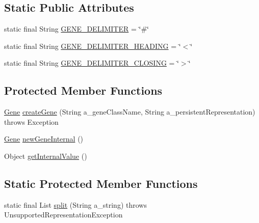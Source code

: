 \subsection*{Static Public Attributes}
\begin{DoxyCompactItemize}
\item 
static final String \hyperlink{classorg_1_1jgap_1_1impl_1_1_composite_gene_ad2e0364fa1181ae5b7334a545864f96b}{G\-E\-N\-E\-\_\-\-D\-E\-L\-I\-M\-I\-T\-E\-R} = \char`\"{}\#\char`\"{}
\item 
static final String \hyperlink{classorg_1_1jgap_1_1impl_1_1_composite_gene_aedd0a6ff682d116a12aabf06b110922a}{G\-E\-N\-E\-\_\-\-D\-E\-L\-I\-M\-I\-T\-E\-R\-\_\-\-H\-E\-A\-D\-I\-N\-G} = \char`\"{}$<$\char`\"{}
\item 
static final String \hyperlink{classorg_1_1jgap_1_1impl_1_1_composite_gene_ab95ce27b4f68e0d22791bb4d82d6c0d5}{G\-E\-N\-E\-\_\-\-D\-E\-L\-I\-M\-I\-T\-E\-R\-\_\-\-C\-L\-O\-S\-I\-N\-G} = \char`\"{}$>$\char`\"{}
\end{DoxyCompactItemize}
\subsection*{Protected Member Functions}
\begin{DoxyCompactItemize}
\item 
\hyperlink{interfaceorg_1_1jgap_1_1_gene}{Gene} \hyperlink{classorg_1_1jgap_1_1impl_1_1_composite_gene_a8bf4b223b9614799efa2ee90d36b0602}{create\-Gene} (String a\-\_\-gene\-Class\-Name, String a\-\_\-persistent\-Representation)  throws Exception 
\item 
\hyperlink{interfaceorg_1_1jgap_1_1_gene}{Gene} \hyperlink{classorg_1_1jgap_1_1impl_1_1_composite_gene_ab71f66feb3b88bb9bdcab5682abd4b03}{new\-Gene\-Internal} ()
\item 
Object \hyperlink{classorg_1_1jgap_1_1impl_1_1_composite_gene_a9ee20f6169c0d441cdacb3685d5336f6}{get\-Internal\-Value} ()
\end{DoxyCompactItemize}
\subsection*{Static Protected Member Functions}
\begin{DoxyCompactItemize}
\item 
static final List \hyperlink{classorg_1_1jgap_1_1impl_1_1_composite_gene_a8a2fa0b4b68a8c06457d2b56166c56fd}{split} (String a\-\_\-string)  throws Unsupported\-Representation\-Exception 
\end{DoxyCompactItemize}
